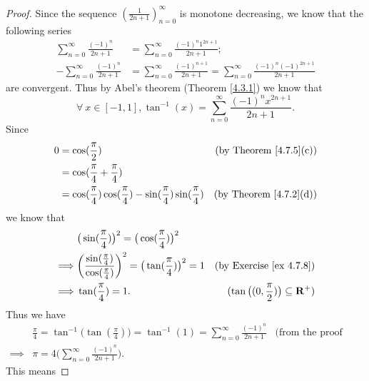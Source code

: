 \begin{proof}
    Since the sequence \((\frac{1}{2n + 1})_{n = 0}^\infty\) is monotone decreasing, we know that the following series
    \begin{align*}
        \sum_{n = 0}^\infty \frac{(-1)^n}{2n + 1}  & = \sum_{n = 0}^\infty \frac{(-1)^n 1^{2n + 1}}{2n + 1};                                                     \\
        -\sum_{n = 0}^\infty \frac{(-1)^n}{2n + 1} & = \sum_{n = 0}^\infty \frac{(-1)^{n + 1}}{2n + 1} = \sum_{n = 0}^\infty \frac{(-1)^n (-1)^{2n + 1}}{2n + 1}
    \end{align*}
    are convergent.
    Thus by Abel's theorem (Theorem \ref{4.3.1}) we know that
    \[
        \forall\ x \in [-1, 1], \tan^{-1}(x) = \sum_{n = 0}^\infty \frac{(-1)^n x^{2n + 1}}{2n + 1}.
    \]
    Since
    \begin{align*}
        0 & = \cos(\frac{\pi}{2})                                                               & \text{(by Theorem \ref{4.7.5}(c))} \\
          & = \cos(\frac{\pi}{4} + \frac{\pi}{4})                                                                                    \\
          & = \cos(\frac{\pi}{4}) \cos(\frac{\pi}{4}) - \sin(\frac{\pi}{4}) \sin(\frac{\pi}{4}) & \text{(by Theorem \ref{4.7.2}(d))}
    \end{align*}
    we know that
    \begin{align*}
                 & \big(\sin(\frac{\pi}{4})\big)^2 = \big(\cos(\frac{\pi}{4})\big)^2                                                                                               \\
        \implies & \bigg(\frac{\sin(\frac{\pi}{4})}{\cos(\frac{\pi}{4})}\bigg)^2 = \big(\tan(\frac{\pi}{4})\big)^2 = 1 & \text{(by Exercise \ref{ex 4.7.8})}                       \\
        \implies & \tan(\frac{\pi}{4}) = 1.                                                                            & (\tan\big((0, \frac{\pi}{2})\big) \subseteq \mathbf{R}^+)
    \end{align*}
    Thus we have
    \begin{align*}
                 & \frac{\pi}{4} = \tan^{-1}\big(\tan(\frac{\pi}{4})\big) = \tan^{-1}(1) = \sum_{n = 0}^\infty \frac{(-1)^n}{2n + 1} & \text{(from the proof above)} \\
        \implies & \pi = 4 \bigg(\sum_{n = 0}^\infty \frac{(-1)^n}{2n + 1}\bigg).
    \end{align*}
    This means

\end{proof}
